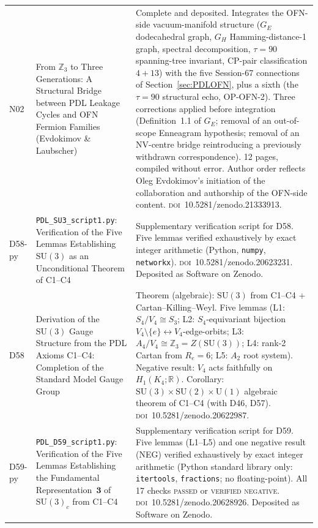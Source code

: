 \documentclass[11pt,a4paper]{article}
\theoremstyle{plain}
\theoremstyle{definition}
\theoremstyle{remark}
\begin{document}
\begin{longtable}{L{1.3cm}L{3.8cm}L{8.0cm}}
N02 & From $\mathbb{Z}_3$ to Three Generations: A Structural Bridge between PDL Leakage Cycles and OFN Fermion Families (Evdokimov \& Laubscher)~\cite{N02} & Complete and deposited. Integrates the OFN-side vacuum-manifold structure ($G_E$ dodecahedral graph, $G_H$ Hamming-distance-1 graph, spectral decomposition, $\tau=90$ spanning-tree invariant, CP-pair classification $4+13$) with the five Session-67 connections of Section~\ref{sec:PDLOFN}, plus a sixth (the $\tau=90$ structural echo, OP-OFN-2). Three corrections applied before integration (Definition~1.1 of $G_E$; removal of an out-of-scope Enneagram hypothesis; removal of an NV-centre bridge reintroducing a previously withdrawn correspondence). 12 pages, compiled without error. Author order reflects Oleg Evdokimov's initiation of the collaboration and authorship of the OFN-side content. \textsc{doi}~10.5281/zenodo.21333913.\\[0.4em]
D58-py & \texttt{PDL\_SU3\_script1.py}: Verification of the Five Lemmas Establishing $\mathrm{SU}(3)$ as an Unconditional Theorem of C1--C4~\cite{D58py} & Supplementary verification script for D58. Five lemmas verified exhaustively by exact integer arithmetic (Python, \texttt{numpy}, \texttt{networkx}). \textsc{doi}~10.5281/zenodo.20623231. Deposited as Software on Zenodo.\\[0.4em]
D58 & Derivation of the $\mathrm{SU}(3)$ Gauge Structure from the PDL Axioms C1--C4: Completion of the Standard Model Gauge Group~\cite{D58} & \textcolor{proofblue}{Theorem} (algebraic): $\mathrm{SU}(3)$ from C1--C4 + Cartan--Killing--Weyl. Five lemmas (L1: $S_4/V_4\cong S_3$; L2: $S_4$-equivariant bijection $V_4\setminus\{e\}\leftrightarrow V_4$-edge-orbits; L3: $A_4/V_4\cong\mathbb{Z}_3 = Z(\mathrm{SU}(3))$; L4: rank-2 Cartan from $R_e=6$; L5: $A_2$ root system). Negative result: $V_4$ acts faithfully on $H_1(K_4;\mathbb{R})$. Corollary: $\mathrm{SU}(3)\times\mathrm{SU}(2)\times\mathrm{U}(1)$ algebraic theorem of C1--C4 (with D46, D57). \textsc{doi}~10.5281/zenodo.20622987.\\[0.4em]
D59-py & \texttt{PDL\_D59\_script1.py}: Verification of the Five Lemmas Establishing the Fundamental Representation~$\mathbf{3}$ of $\mathrm{SU}(3)_c$ from C1--C4~\cite{D59py} & Supplementary verification script for D59. Five lemmas (L1--L5) and one negative result (NEG) verified exhaustively by exact integer arithmetic (Python standard library only: \texttt{itertools}, \texttt{fractions}; no floating-point). All 17 checks \textsc{passed} or \textsc{verified negative}. \textsc{doi}~10.5281/zenodo.20628926. Deposited as Software on Zenodo.\\[0.4em]

\end{longtable}
\end{document}
